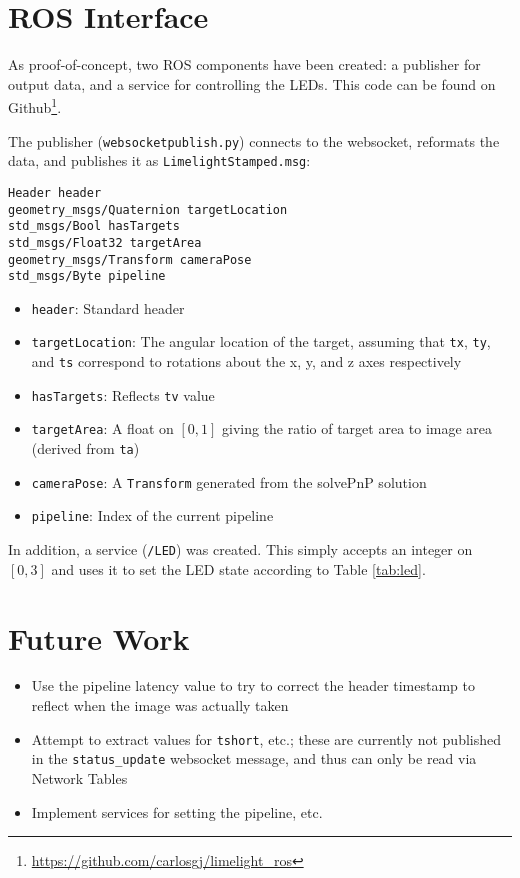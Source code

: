 \documentclass{article}
\begin{document}
\section{ROS Interface}
\par As proof-of-concept, two ROS components have been created: a publisher for output data, and a service for controlling the LEDs. This code can be found on Github\footnote{\url{https://github.com/carlosgj/limelight\_ros}}.
\par The publisher (\texttt{websocketpublish.py}) connects to the websocket, reformats the data, and publishes it as \texttt{LimelightStamped.msg}:
\begin{verbatim}
Header header
geometry_msgs/Quaternion targetLocation
std_msgs/Bool hasTargets
std_msgs/Float32 targetArea
geometry_msgs/Transform cameraPose
std_msgs/Byte pipeline
\end{verbatim}
\begin{itemize}
	\item \texttt{header}: Standard header
	\item \texttt{targetLocation}: The angular location of the target, assuming that \texttt{tx}, \texttt{ty}, and \texttt{ts} correspond to rotations about the x, y, and z axes respectively 
	\item \texttt{hasTargets}: Reflects \texttt{tv} value
	\item \texttt{targetArea}: A float on $[0,1]$ giving the ratio of target area to image area (derived from \texttt{ta})
	\item \texttt{cameraPose}: A \texttt{Transform} generated from the solvePnP solution
	\item \texttt{pipeline}: Index of the current pipeline
\end{itemize}
\par In addition, a service (\texttt{/LED}) was created. This simply accepts an integer on $[0,3]$ and uses it to set the LED state according to Table \ref{tab:led}. 
\section{Future Work}
\begin{itemize}
	\item Use the pipeline latency value to try to correct the header timestamp to reflect when the image was actually taken
	\item Attempt to extract values for \texttt{tshort}, etc.; these are currently not published in the \texttt{status\_update} websocket message, and thus can only be read via Network Tables
	\item Implement services for setting the pipeline, etc.
\end{itemize}
\end{document}
